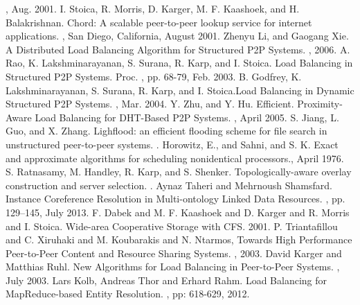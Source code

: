 \documentclass {article}
\begin{document}
\begin{thebibliography}{00}
, Aug. 2001.
 I. Stoica, R. Morris, D. Karger, M. F. Kaashoek, and H. Balakrishnan.
\newblock Chord: A scalable peer-to-peer lookup service for internet applications.
, San Diego, California, August 2001.
 Zhenyu Li, and Gaogang Xie. 
\newblock A Distributed Load Balancing Algorithm for Structured P2P Systems. , 2006.
 A. Rao, K. Lakshminarayanan, S. Surana, R. Karp, and I. Stoica.
\newblock Load Balancing in Structured P2P Systems. Proc. , pp. 68-79, Feb. 2003.
 B. Godfrey, K. Lakshminarayanan, S. Surana, R. Karp, and I.
Stoica.\newblock Load Balancing in Dynamic Structured P2P Systems.
 , Mar. 2004.
 Y. Zhu, and Y. Hu. Efficient. \newblock Proximity-Aware Load Balancing for DHT-Based P2P Systems. , April 2005.
 S. Jiang, L. Guo, and X. Zhang. \newblock Lighflood: an efficient flooding scheme for file search in unstructured peer-to-peer systems. .
 Horowitz, E., and Sahni, and S. K. \newblock Exact and approximate algorithms for scheduling nonidentical processors., April 1976.
 S. Ratnasamy, M. Handley, R. Karp, and S. Shenker.
 \newblock Topologically-aware overlay construction and server selection.
.
 Aynaz Taheri and Mehrnoush Shamsfard. \newblock Instance Coreference Resolution in Multi-ontology Linked Data Resources. , pp. 129--145, July 2013.
 F. Dabek and M. F. Kaashoek and D. Karger and R. Morris and
I. Stoica. \newblock Wide-area Cooperative Storage with CFS. 2001.
 P. Triantafillou and C. Xiruhaki and M. Koubarakis and N. Ntarmos,
\newblock Towards High Performance Peer-to-Peer Content and Resource
Sharing Systems. , 2003.
 David Karger and Matthias Ruhl. \newblock New Algorithms for Load
Balancing in Peer-to-Peer Systems. , July 2003.
 Lars Kolb, Andreas Thor and Erhard Rahm. \newblock Load Balancing for
MapReduce-based Entity Resolution. , pp: 618-629, 2012.
\end{thebibliography}
 
\end{document}
